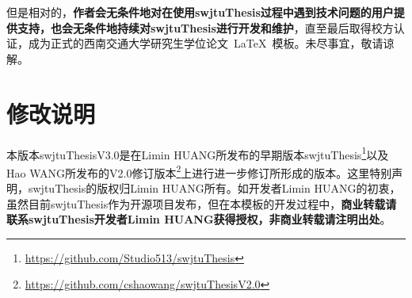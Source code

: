 \par
但是相对的，\textbf{作者会无条件地对在使用swjtuThesis过程中遇到技术问题的用户提供支持，也会无条件地持续对swjtuThesis进行开发和维护}，直至最后取得校方认证，成为正式的西南交通大学研究生学位论文~\LaTeX{}~模板。未尽事宜，敬请谅解。


\section{修改说明}
本版本swjtuThesisV3.0是在Limin HUANG所发布的早期版本swjtuThesis\footnote{\url{https://github.com/Studio513/swjtuThesis}}以及Hao WANG所发布的V2.0修订版本\footnote{\url{https://github.com/cshaowang/swjtuThesisV2.0}}上进行进一步修订所形成的版本。这里特别声明，swjtuThesis的版权归Limin HUANG所有。如开发者Limin HUANG的初衷，虽然目前swjtuThesis作为开源项目发布，但在本模板的开发过程中，\textbf{商业转载请联系swjtuThesis开发者Limin HUANG获得授权，非商业转载请注明出处}。